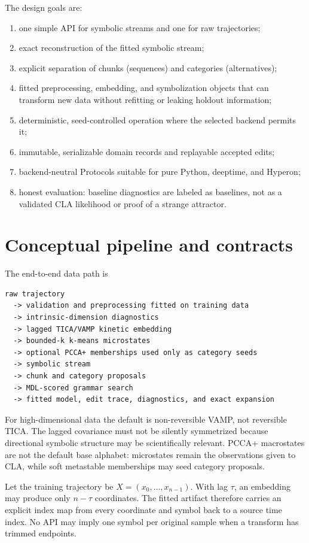 \documentclass[11pt]{article}
\begin{document}
The design goals are:
\begin{enumerate}[nosep]
\item one simple API for symbolic streams and one for raw trajectories;
\item exact reconstruction of the fitted symbolic stream;
\item explicit separation of chunks (sequences) and categories (alternatives);
\item fitted preprocessing, embedding, and symbolization objects that can
  transform new data without refitting or leaking holdout information;
\item deterministic, seed-controlled operation where the selected backend
  permits it;
\item immutable, serializable domain records and replayable accepted edits;
\item backend-neutral Protocols suitable for pure Python, deeptime, and Hyperon;
\item honest evaluation: baseline diagnostics are labeled as baselines, not as
  a validated CLA likelihood or proof of a strange attractor.
\end{enumerate}

\section{Conceptual pipeline and contracts}

The end-to-end data path is
\begin{verbatim}
raw trajectory
  -> validation and preprocessing fitted on training data
  -> intrinsic-dimension diagnostics
  -> lagged TICA/VAMP kinetic embedding
  -> bounded-k k-means microstates
  -> optional PCCA+ memberships used only as category seeds
  -> symbolic stream
  -> chunk and category proposals
  -> MDL-scored grammar search
  -> fitted model, edit trace, diagnostics, and exact expansion
\end{verbatim}

For high-dimensional data the default is non-reversible VAMP, not reversible
TICA. The lagged covariance must not be silently symmetrized because directional
symbolic structure may be scientifically relevant. PCCA+ macrostates are not the
default base alphabet: microstates remain the observations given to CLA, while
soft metastable memberships may seed category proposals.

Let the training trajectory be $X=(x_0,\ldots,x_{n-1})$. With lag $\tau$, an
embedding may produce only $n-\tau$ coordinates. The fitted artifact therefore
carries an explicit index map from every coordinate and symbol back to a source
time index. No API may imply one symbol per original sample when a transform has
trimmed endpoints.
\end{document}
